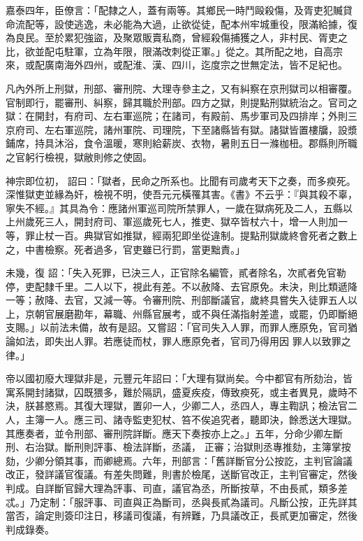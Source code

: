 \begin{pinyinscope}
 嘉泰四年，臣僚言：「配隸之人，蓋有兩等。其鄉民一時鬥毆殺傷，及胥吏犯贓貸命流配等，設使逃逸，未必能為大過，止欲從徒，配本州牢城重役，限滿給據，復為良民。至於累犯強盜，及聚眾販賣私商，曾經殺傷捕獲之人，非村民、胥吏之比，欲並配屯駐軍，立為年限，限滿改刺從正軍。」從之。其所配之地，自高宗來，或配廣南海外四州，或配淮、漢、四川，迄度宗之世無定法，皆不足紀也。



 凡內外所上刑獄，刑部、審刑院、大理寺參主之，又有糾察在京刑獄司以相審覆。官制即行，罷審刑、糾察，歸其職於刑部。四方之獄，則提點刑獄統治之。官司之獄：在開封，有府司、左右軍巡院；在諸司，有殿前、馬步軍司及四排岸；外則三京府司、左右軍巡院，諸州軍院、司理院，下至諸縣皆有獄。諸獄皆置樓牖，設漿鋪席，持具沐浴，食令溫暖，寒則給薪炭、衣物，暑則五日一滌枷杻。郡縣則所職之官躬行檢視，獄敝則修之使固。



 神宗即位初，
 詔曰：「獄者，民命之所系也。比聞有司歲考天下之奏，而多瘐死。深惟獄吏並緣為奸，檢視不明，使吾元元橫罹其害。《書》不云乎：『與其殺不辜，寧失不經。』其具為令：應諸州軍巡司院所禁罪人，一歲在獄病死及二人，五縣以上州歲死三人，開封府司、軍巡歲死七人，推吏、獄卒皆杖六十，增一人則加一等，罪止杖一百。典獄官如推獄，經兩犯即坐從違制。提點刑獄歲終會死者之數上之，中書檢察。死者過多，官吏雖已行罰，當更黜責。」



 未幾，復
 詔：「失入死罪，已決三人，正官除名編管，貳者除名，次貳者免官勒停，吏配隸千里。二人以下，視此有差。不以赦降、去官原免。未決，則比類遞降一等；赦降、去官，又減一等。令審刑院、刑部斷議官，歲終具嘗失入徒罪五人以上，京朝官展磨勘年，幕職、州縣官展考，或不與任滿指射差遣，或罷，仍即斷絕支賜。」以前法未備，故有是詔。又嘗詔：「官司失入人罪，而罪人應原免，官司猶論如法，即失出人罪。若應徒而杖，罪人應原免者，官司乃得用因
 罪人以致罪之律。」



 帝以國初廢大理獄非是，元豐元年詔曰：「大理有獄尚矣。今中都官有所劾治，皆寓系開封諸獄，囚既猥多，難於隔訊，盛夏疾疫，傳致瘐死，或主者異見，歲時不決，朕甚愍焉。其復大理獄，置卯一人，少卿二人，丞四人，專主鞫訊；檢法官二人，主簿一人。應三司、諸寺監吏犯杖、笞不俟追究者，聽即決，餘悉送大理獄。其應奏者，並令刑部、審刑院詳斷。應天下奏按亦上之。」五年，分命少卿左斷刑、右治獄。斷刑則評事、檢法詳斷，丞議，
 正審；治獄則丞專推劾，主簿掌按劾，少卿分領其事，而卿總焉。六年，刑部言：「舊詳斷官分公按訖，主判官論議改正，發詳議官復議。有差失問難，則書於檢尾，送斷官改正，主判官審定，然後判成。自詳斷官歸大理為評事、司直，議官為丞，所斷按草，不由長貳，類多差忒。」乃定制：「服評事、司直與正為斷司，丞與長貳為議司。凡斷公按，正先詳其當否，論定則簽印注日，移議司復議，有辨難，乃具議改正，長貳更加審定，然後判成錄奏。




\end{pinyinscope}
